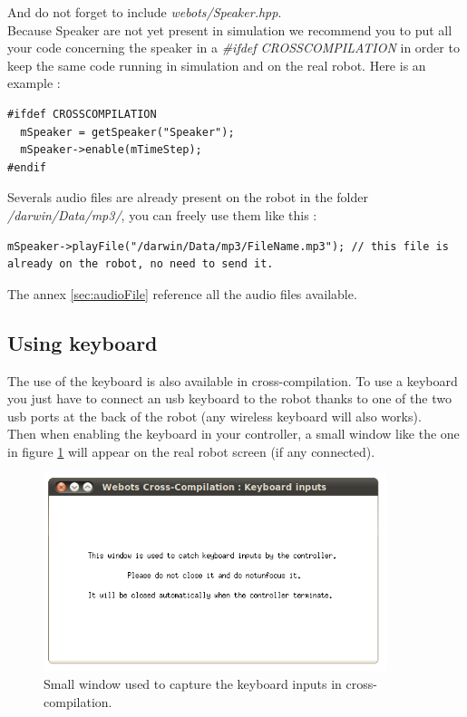 \documentclass[a4paper, 12pt]{article}  		%
\begin{document}
And do not forget to include \textit{webots/Speaker.hpp}.\\

Because Speaker are not yet present in simulation we recommend you to put all your code concerning the speaker in a \textit{\#ifdef CROSSCOMPILATION} in order to keep the same code running in simulation and on the real robot. Here is an example :\\
\lstset{language=c++} 
\lstset{commentstyle=\textit} 
\begin{lstlisting} 
#ifdef CROSSCOMPILATION
  mSpeaker = getSpeaker("Speaker");
  mSpeaker->enable(mTimeStep);
#endif
\end{lstlisting}

Severals audio files are already present on the robot in the folder \textit{/darwin/Data/mp3/}, you can freely use them like this :\\
\lstset{language=c++} 
\lstset{commentstyle=\textit} 
\begin{lstlisting} 
mSpeaker->playFile("/darwin/Data/mp3/FileName.mp3"); // this file is already on the robot, no need to send it.
\end{lstlisting}

The annex \ref{sec:audioFile} reference all the audio files available.\\

\newpage
\subsection{Using keyboard}

The use of the keyboard is also available in cross-compilation. To use a keyboard you just have to connect an usb keyboard to the robot thanks to one of the two usb ports at the back of the robot (any wireless keyboard will also works).\\

Then when enabling the keyboard in your controller, a small window like the one in figure \ref{keyboardWindow} will appear on the real robot screen (if any connected).\\

\begin{figure}[H]
\begin{center}
\includegraphics[width=10cm]{keyboardWindow.png}
\caption{Small window used to capture the keyboard inputs in cross-compilation.}
\label{keyboardWindow}
\end{center}
\end{figure}
\end{document}
